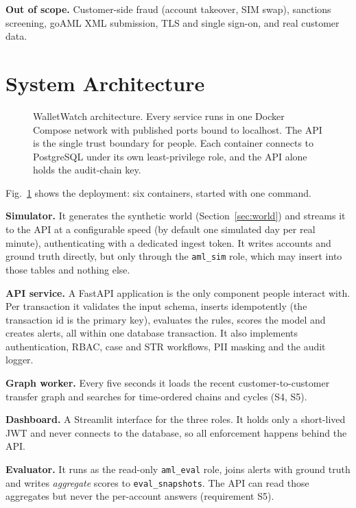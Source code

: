 \documentclass[conference,10pt]{IEEEtran}
\newcommand{\code}[1]{\texttt{\small #1}}
\begin{document}
\textbf{Out of scope.} Customer-side fraud (account takeover, SIM swap), sanctions screening,
goAML XML submission, TLS and single sign-on, and real customer data.

\section{System Architecture}\label{sec:arch}

\begin{figure}[t]
  \centering
  \resizebox{\textwidth}{!}{}
  \caption{WalletWatch architecture. Every service runs in one Docker Compose network with published
  ports bound to localhost. The API is the single trust boundary for people. Each container connects
  to PostgreSQL under its own least-privilege role, and the API alone holds the audit-chain key.}
  \label{fig:arch}
\end{figure}

Fig.~\ref{fig:arch} shows the deployment: six containers, started with one command.

\textbf{Simulator.} It generates the synthetic world (Section~\ref{sec:world}) and streams it to
the API at a configurable speed (by default one simulated day per real minute), authenticating with a
dedicated ingest token. It writes accounts and ground truth directly, but only through the
\code{aml\_sim} role, which may insert into those tables and nothing else.

\textbf{API service.} A FastAPI application is the only component people interact with. Per
transaction it validates the input schema, inserts idempotently (the transaction id is the primary
key), evaluates the rules, scores the model and creates alerts, all within one database
transaction. It also implements authentication, RBAC, case and STR workflows, PII masking and the
audit logger.

\textbf{Graph worker.} Every five seconds it loads the recent customer-to-customer transfer graph
and searches for time-ordered chains and cycles (S4, S5).

\textbf{Dashboard.} A Streamlit interface for the three roles. It holds only a short-lived JWT and
never connects to the database, so all enforcement happens behind the API.

\textbf{Evaluator.} It runs as the read-only \code{aml\_eval} role, joins alerts with ground truth
and writes \emph{aggregate} scores to \code{eval\_snapshots}. The API can read those aggregates but
never the per-account answers (requirement S5).
\end{document}
